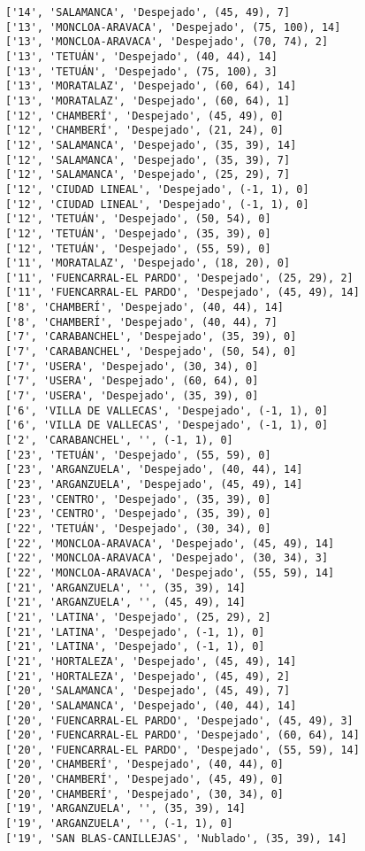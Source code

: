 \documentclass[11pt]{article}
\begin{document}
\begin{Verbatim}[commandchars=\\\{\}]
['14', 'SALAMANCA', 'Despejado', (45, 49), 7]
['13', 'MONCLOA-ARAVACA', 'Despejado', (75, 100), 14]
['13', 'MONCLOA-ARAVACA', 'Despejado', (70, 74), 2]
['13', 'TETUÁN', 'Despejado', (40, 44), 14]
['13', 'TETUÁN', 'Despejado', (75, 100), 3]
['13', 'MORATALAZ', 'Despejado', (60, 64), 14]
['13', 'MORATALAZ', 'Despejado', (60, 64), 1]
['12', 'CHAMBERÍ', 'Despejado', (45, 49), 0]
['12', 'CHAMBERÍ', 'Despejado', (21, 24), 0]
['12', 'SALAMANCA', 'Despejado', (35, 39), 14]
['12', 'SALAMANCA', 'Despejado', (35, 39), 7]
['12', 'SALAMANCA', 'Despejado', (25, 29), 7]
['12', 'CIUDAD LINEAL', 'Despejado', (-1, 1), 0]
['12', 'CIUDAD LINEAL', 'Despejado', (-1, 1), 0]
['12', 'TETUÁN', 'Despejado', (50, 54), 0]
['12', 'TETUÁN', 'Despejado', (35, 39), 0]
['12', 'TETUÁN', 'Despejado', (55, 59), 0]
['11', 'MORATALAZ', 'Despejado', (18, 20), 0]
['11', 'FUENCARRAL-EL PARDO', 'Despejado', (25, 29), 2]
['11', 'FUENCARRAL-EL PARDO', 'Despejado', (45, 49), 14]
['8', 'CHAMBERÍ', 'Despejado', (40, 44), 14]
['8', 'CHAMBERÍ', 'Despejado', (40, 44), 7]
['7', 'CARABANCHEL', 'Despejado', (35, 39), 0]
['7', 'CARABANCHEL', 'Despejado', (50, 54), 0]
['7', 'USERA', 'Despejado', (30, 34), 0]
['7', 'USERA', 'Despejado', (60, 64), 0]
['7', 'USERA', 'Despejado', (35, 39), 0]
['6', 'VILLA DE VALLECAS', 'Despejado', (-1, 1), 0]
['6', 'VILLA DE VALLECAS', 'Despejado', (-1, 1), 0]
['2', 'CARABANCHEL', '', (-1, 1), 0]
['23', 'TETUÁN', 'Despejado', (55, 59), 0]
['23', 'ARGANZUELA', 'Despejado', (40, 44), 14]
['23', 'ARGANZUELA', 'Despejado', (45, 49), 14]
['23', 'CENTRO', 'Despejado', (35, 39), 0]
['23', 'CENTRO', 'Despejado', (35, 39), 0]
['22', 'TETUÁN', 'Despejado', (30, 34), 0]
['22', 'MONCLOA-ARAVACA', 'Despejado', (45, 49), 14]
['22', 'MONCLOA-ARAVACA', 'Despejado', (30, 34), 3]
['22', 'MONCLOA-ARAVACA', 'Despejado', (55, 59), 14]
['21', 'ARGANZUELA', '', (35, 39), 14]
['21', 'ARGANZUELA', '', (45, 49), 14]
['21', 'LATINA', 'Despejado', (25, 29), 2]
['21', 'LATINA', 'Despejado', (-1, 1), 0]
['21', 'LATINA', 'Despejado', (-1, 1), 0]
['21', 'HORTALEZA', 'Despejado', (45, 49), 14]
['21', 'HORTALEZA', 'Despejado', (45, 49), 2]
['20', 'SALAMANCA', 'Despejado', (45, 49), 7]
['20', 'SALAMANCA', 'Despejado', (40, 44), 14]
['20', 'FUENCARRAL-EL PARDO', 'Despejado', (45, 49), 3]
['20', 'FUENCARRAL-EL PARDO', 'Despejado', (60, 64), 14]
['20', 'FUENCARRAL-EL PARDO', 'Despejado', (55, 59), 14]
['20', 'CHAMBERÍ', 'Despejado', (40, 44), 0]
['20', 'CHAMBERÍ', 'Despejado', (45, 49), 0]
['20', 'CHAMBERÍ', 'Despejado', (30, 34), 0]
['19', 'ARGANZUELA', '', (35, 39), 14]
['19', 'ARGANZUELA', '', (-1, 1), 0]
['19', 'SAN BLAS-CANILLEJAS', 'Nublado', (35, 39), 14]

\end{Verbatim}
\end{document}

